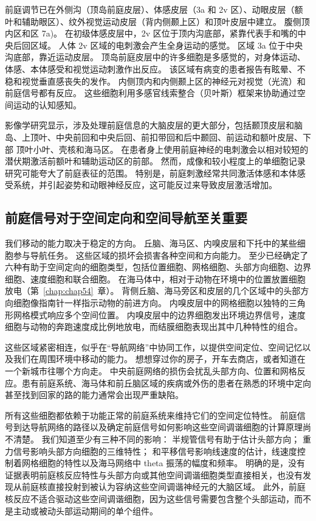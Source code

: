 前庭调节已在外侧沟（顶岛前庭皮层）、体感皮层（3a 和 2v 区）、动眼皮层（额叶和辅助眼区）、纹外视觉运动皮层（背内侧颞上区）和顶叶皮层中建立。
腹侧顶内区和区 7a)。
在初级体感皮层中，2v 区位于顶内沟底部，紧靠代表手和嘴的中央后回区域。
人体 2v 区域的电刺激会产生全身运动的感觉。
区域 3a 位于中央沟底部，靠近运动皮层。
顶岛前庭皮层中的许多细胞是多感觉的，对身体运动、体感、本体感受和视觉运动刺激作出反应。
该区域有病变的患者报告有眩晕、不稳和视觉垂直感丧失的发作。
内侧顶内和内侧颞上区的神经元对视觉（光流）和前庭信号都有反应。
这些细胞利用多感官线索整合（贝叶斯）框架来协助通过空间运动的认知感知。


影像学研究显示，涉及处理前庭信息的大脑皮层的更大部分，包括颞顶皮层和脑岛、上顶叶、中央前回和中央后回、前扣带回和后中颞回、前运动和额叶皮层、下部 顶叶小叶、壳核和海马区。
在患者身上使用前庭神经的电刺激会以相对较短的潜伏期激活前额叶和辅助运动区的前部。
然而，成像和较小程度上的单细胞记录研究可能夸大了前庭表征的范围。
特别是，前庭刺激经常共同激活体感和本体感受系统，并引起姿势和动眼神经反应，这可能反过来导致皮层激活增加。



\subsection{前庭信号对于空间定向和空间导航至关重要}

我们移动的能力取决于稳定的方向。
丘脑、海马区、内嗅皮层和下托中的某些细胞参与导航任务。
这些区域的损坏会损害各种空间和方向能力。
至少已经确定了六种有助于空间定向的细胞类型，包括位置细胞、网格细胞、头部方向细胞、边界细胞、速度细胞和联合细胞。
在海马体中，相对于动物在环境中的位置放置细胞放电（第~\ref{chap:chap54}~章）。
背侧丘脑、海马旁区和皮层的几个区域中的头部方向细胞像指南针一样指示动物的前进方向。
内嗅皮层中的网格细胞以独特的三角形网格模式响应多个空间位置。
内嗅皮层中的边界细胞发出环境边界信号，速度细胞与动物的奔跑速度成比例地放电，而结膜细胞表现出其中几种特性的组合。


这些区域紧密相连，似乎在“导航网络”中协同工作，以提供空间定位、空间记忆以及我们在周围环境中移动的能力。
想想穿过你的房子，开车去商店，或者知道在一个新城市往哪个方向走。
中央前庭网络的损伤会扰乱头部方向、位置和网格反应。患有前庭系统、海马体和前丘脑区域的疾病或外伤的患者在熟悉的环境中定向甚至找到回家的路的能力通常会出现严重缺陷。


所有这些细胞都依赖于功能正常的前庭系统来维持它们的空间定位特性。
前庭信号到达导航网络的路径以及确定前庭信号如何影响这些空间调谐细胞的计算原理尚不清楚。
我们知道至少有三种不同的影响： 半规管信号有助于估计头部方向；
重力信号影响头部方向细胞的三维特性；
和平移信号影响线速度的估计，线速度控制着网格细胞的特性以及海马网络中 theta 振荡的幅度和频率。
明确的是，没有证据表明前庭核反应特性与头部方向或其他空间调谐细胞类型直接相关，也没有发现从前庭核直接投射到被认为容纳这些空间调谐神经元的大脑区域。
此外，前庭核反应不适合驱动这些空间调谐细胞，因为这些信号需要包含整个头部运动，而不是主动或被动头部运动期间的单个组件。


